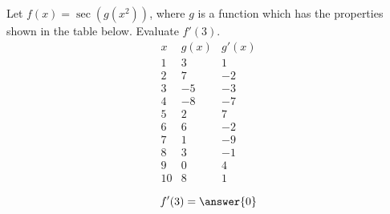 \documentclass{ximera}
\begin{document}
\begin{exercise}
	Let $f(x) = \sec( g(x^2) )$, where $g$ is a function which has the properties shown in the table below.  Evaluate $f'(3)$.
	\[	\begin{array}{c|c|c}
 			x & g(x) & g'(x)\\ \hline
			1 & 3 & 1\\
			2 & 7 & -2\\
			3 & -5 & -3\\
			4 & -8 & -7\\
			5 & 2 & 7\\
			6 & 6 & -2\\
			7 & 1 & -9\\
			8 & 3 & -1\\
			9 & 0 & 4\\
			10 & 8 & 1\\
		\end{array}
	\]
	\[ f'(3) = \answer{0} \]
\end{exercise}
\end{document}
